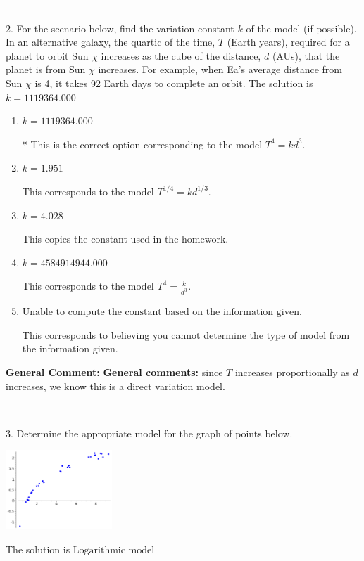\documentclass{extbook}[14pt]
\begin{document}
-----------------------------------------------

2. For the scenario below, find the variation constant $k$ of the model (if possible).
In an alternative galaxy, the quartic of the time, $T$ (Earth years), required for a planet to orbit Sun $\chi$ increases as the cube of the distance, $d$ (AUs), that the planet is from Sun $\chi$ increases. For example, when Ea's average distance from Sun $\chi$ is 4, it takes 92 Earth days to complete an orbit. 
The solution is $ k = 1119364.000 $ 

\begin{enumerate}[label=\Alph*.] 
\item $ k = 1119364.000 $ 

 * This is the correct option corresponding to the model $T^{4} = k d^{3}$. 
\item $ k = 1.951 $ 

 This corresponds to the model $T^{1/4} = k d^{1/3}$. 
\item $ k = 4.028 $ 

 This copies the constant used in the homework. 
\item $ k = 4584914944.000 $ 

 This corresponds to the model $T^{4} = \frac{k}{d^{3}}$. 
\item $ \text{Unable to compute the constant based on the information given.} $ 

 This corresponds to believing you cannot determine the type of model from the information given. 
\end{enumerate} 
 
\textbf{General Comment:} \textbf{General comments:} since $T$ increases proportionally as $d$ increases, we know this is a direct variation model. 

-----------------------------------------------

3. Determine the appropriate model for the graph of points below.
\begin{center} \includegraphics[width=0.3\textwidth]{../Figures/identifyModelGraph12A.png} \end{center} 

The solution is $ \text{Logarithmic model} $ 
\end{document}
